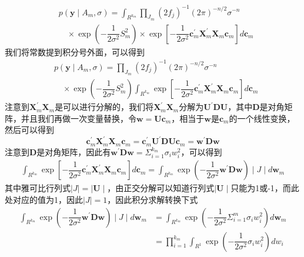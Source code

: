 \documentclass[12pt]{article} %
\begin{document}
	\begin{equation*}
		\begin{aligned}
			&p\left(\mathbf{y} \mid A_{m}, \sigma\right)=\int_{R^{k_m}}  \prod_{J_{m}} \left(2 f_{j}\right)^{-1}  (2 \pi)^{-n / 2} \sigma^{-n} \\
			&\quad \times \exp (-\dfrac{1}{2\sigma^2} S_m^2) \times \exp \left[ -\dfrac{1}{2\sigma^2  } \mathbf{c}_m^{\prime}  \mathbf{X}_{m}^{\prime} \mathbf{X}_{m} \mathbf{c}_m \right] d \mathbf{c}_m
		\end{aligned}
	\end{equation*}
	我们将常数提到积分号外面，可以得到
	\begin{equation*}
		\begin{aligned}
			&p\left(\mathbf{y} \mid A_{m}, \sigma\right)=  \prod_{J_{m}} \left(2 f_{j}\right)^{-1}  (2 \pi)^{-n / 2} \sigma^{-n} \\
			&\quad \times \exp (-\dfrac{1}{2\sigma^2} S_m^2) \int_{R^{k_m}} \exp \left[ -\dfrac{1}{2\sigma^2  } \mathbf{c}_m^{\prime}  \mathbf{X}_{m}^{\prime} \mathbf{X}_{m} \mathbf{c}_m \right] d \mathbf{c}_m
		\end{aligned}
	\end{equation*}
	注意到$ \mathbf{X}_{m}^{\prime} \mathbf{X}_{m}$是可以进行分解的，我们将$ \mathbf{X}_{m}^{\prime} \mathbf{X}_{m}$分解为$\mathbf{U}^{\prime} \mathbf{D} \mathbf{U}$，其中$\mathbf{D}$是对角矩阵，并且我们再做一次变量替换，令$\mathbf{w} = \mathbf{U} \mathbf{c}_m$，相当于$\mathbf{w}$是$\mathbf{c}_m$的一个线性变换，然后可以得到
	$$\mathbf{c}_m^{\prime}  \mathbf{X}_{m}^{\prime} \mathbf{X}_{m} \mathbf{c}_m = \mathbf{c}_m^\prime \mathbf{U}^{\prime} \mathbf{D} \mathbf{U} \mathbf{c}_m = \mathbf{w}^\prime \mathbf{D} \mathbf{w}$$
	注意到$\mathbf{D}$是对角矩阵，因此有$\mathbf{w}^\prime \mathbf{D} \mathbf{w} = \Sigma_{i=1}^{k_m} \sigma_i w_i^2$，可以得到
	\begin{equation*}
		\begin{aligned}
			\int_{R^{k_m}} \exp \left[ -\dfrac{1}{2\sigma^2  } \mathbf{c}_m^{\prime}  \mathbf{X}_{m}^{\prime} \mathbf{X}_{m} \mathbf{c}_m \right] d \mathbf{c}_m = \int_{R^{k_m}} \exp ( -\dfrac{1}{2\sigma^2  } \mathbf{w}^\prime \mathbf{D} \mathbf{w} ) \mid J \mid d \mathbf{w}_m
		\end{aligned}
	\end{equation*}
	其中雅可比行列式$\mid J \mid = \mid \mathbf{U} \mid$，由正交分解可以知道行列式$\mid \mathbf{U} \mid$只能为1或-1，而此处对应的值为1，因此$\mid J \mid = 1$，因此积分求解转换下式
	\begin{equation*}
		\begin{aligned}
			\int_{R^{k_m}} \exp ( -\dfrac{1}{2\sigma^2  } \mathbf{w}^\prime \mathbf{D} \mathbf{w} ) \mid J \mid d \mathbf{w}_m &= \int_{R^{k_m}} \exp ( -\dfrac{1}{2\sigma^2  } \Sigma_{i=1}^m \sigma_i w_i^2) d \mathbf{w}_m \\
			&= \prod_{i=1}^{k_m} \int_{R^1} \exp ( -\dfrac{1}{2\sigma^2  } \sigma_i w_i^2) d w_i \\
		\end{aligned}
	\end{equation*}
\end{document}
